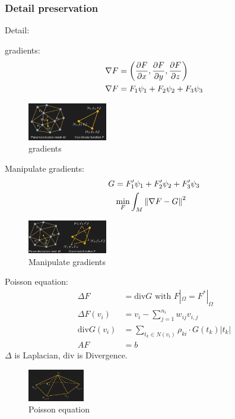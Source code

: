 \subsubsection{Detail preservation}
Detail: 

gradients:
\begin{align*}
    \nabla F&=\left( \frac{\partial F}{\partial x}, \frac{\partial F}{\partial y}, \frac{\partial F}{\partial z} \right)\\
    \nabla F&= F_1 \psi_1 + F_2 \psi_2 + F_3 \psi_3
\end{align*}

\begin{figure}[!htb]
    \centering
    \includegraphics[width=0.309\textwidth]{pic/ACG6/Detail}
    \caption{gradients}
\end{figure}

Manipulate gradients:
\begin{align*}
    G&= F'_1 \psi_1 + F'_2 \psi_2 + F'_3 \psi_3\\
    &\min_F \int_M \left\lVert\nabla F-G\right\rVert^2
\end{align*}

\begin{figure}[!htb]
    \centering
    \includegraphics[width=0.309\textwidth]{pic/ACG6/Manipulate gradients}
    \caption{Manipulate gradients}
\end{figure}

Poisson equation:
\begin{align*}
    \Delta F &= \mathrm{div} G \text{ with }F|_\Omega = F^*|_\Omega\\
    \Delta F(v_i)&=v_i-\sum_{j=1}^{n_i}w_{ij}v_{i,j}\\
    \mathrm{div} G(v_i)&=\sum_{t_k\in N(v_i)}\rho_{ki}\cdot G(t_k)|t_k|\\
    AF&=b
\end{align*}
$\Delta$ is Laplacian, $\mathrm{div}$ is Divergence.

\begin{figure}[!htb]
    \centering
    \includegraphics[width=0.22\textwidth]{pic/ACG6/Poisson equation}
    \caption{Poisson equation}
\end{figure}


